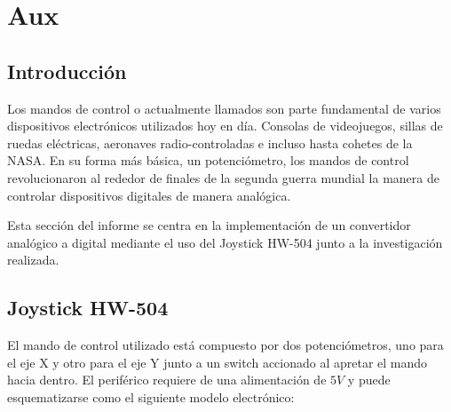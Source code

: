 

\section{Aux}
\tableofcontents

\subsection{Introducción}

Los mandos de control o actualmente llamados  son parte fundamental de varios dispositivos electrónicos utilizados hoy en día. Consolas de videojuegos, sillas de ruedas eléctricas, aeronaves radio-controladas e incluso hasta cohetes de la NASA. En su forma más básica, un potenciómetro, los mandos de control revolucionaron al rededor de finales de la segunda guerra mundial la manera de controlar dispositivos digitales de manera analógica. 

Esta sección del informe se centra en la implementación de un convertidor analógico a digital mediante el uso del Joystick HW-504 junto a la investigación realizada.

\subsection{Joystick HW-504}

El mando de control utilizado está compuesto por dos potenciómetros, uno para el eje X y otro para el eje Y junto a un switch accionado al apretar el mando hacia dentro. El periférico requiere de una alimentación de $5V$ y puede esquematizarse como el siguiente modelo electrónico:

